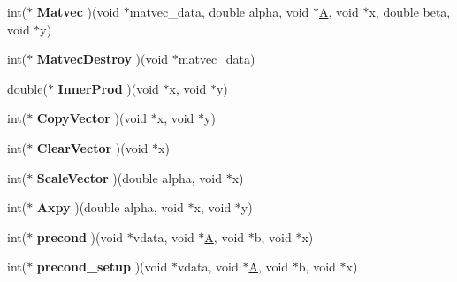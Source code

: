 \begin{DoxyCompactItemize}
\item 
\hypertarget{structhypre__PCGFunctions_aa9173923da123df082398997b230f3c7}{}int($\ast$ {\bfseries Matvec} )(void $\ast$matvec\+\_\+data, double alpha, void $\ast$\hyperlink{structA}{A}, void $\ast$x, double beta, void $\ast$y)\label{structhypre__PCGFunctions_aa9173923da123df082398997b230f3c7}

\item 
\hypertarget{structhypre__PCGFunctions_a9e36a23d7b5b2585d7f522c7b390a0f0}{}int($\ast$ {\bfseries Matvec\+Destroy} )(void $\ast$matvec\+\_\+data)\label{structhypre__PCGFunctions_a9e36a23d7b5b2585d7f522c7b390a0f0}

\item 
\hypertarget{structhypre__PCGFunctions_a4914af1fa866770c49017f5ccecdf1f8}{}double($\ast$ {\bfseries Inner\+Prod} )(void $\ast$x, void $\ast$y)\label{structhypre__PCGFunctions_a4914af1fa866770c49017f5ccecdf1f8}

\item 
\hypertarget{structhypre__PCGFunctions_a90e7623f3a4a15209a7930b9925a4034}{}int($\ast$ {\bfseries Copy\+Vector} )(void $\ast$x, void $\ast$y)\label{structhypre__PCGFunctions_a90e7623f3a4a15209a7930b9925a4034}

\item 
\hypertarget{structhypre__PCGFunctions_aa8df3a6f606ce4a77b43998569e2cfb9}{}int($\ast$ {\bfseries Clear\+Vector} )(void $\ast$x)\label{structhypre__PCGFunctions_aa8df3a6f606ce4a77b43998569e2cfb9}

\item 
\hypertarget{structhypre__PCGFunctions_a976647903fd8883f1cf774e716696a89}{}int($\ast$ {\bfseries Scale\+Vector} )(double alpha, void $\ast$x)\label{structhypre__PCGFunctions_a976647903fd8883f1cf774e716696a89}

\item 
\hypertarget{structhypre__PCGFunctions_a2f8556b8e22de50bd5678502b290b360}{}int($\ast$ {\bfseries Axpy} )(double alpha, void $\ast$x, void $\ast$y)\label{structhypre__PCGFunctions_a2f8556b8e22de50bd5678502b290b360}

\item 
\hypertarget{structhypre__PCGFunctions_a71c318780338a5a90131b38998f1524d}{}int($\ast$ {\bfseries precond} )(void $\ast$vdata, void $\ast$\hyperlink{structA}{A}, void $\ast$b, void $\ast$x)\label{structhypre__PCGFunctions_a71c318780338a5a90131b38998f1524d}

\item 
\hypertarget{structhypre__PCGFunctions_ab46805ba7657a503c7e608b608f7f803}{}int($\ast$ {\bfseries precond\+\_\+setup} )(void $\ast$vdata, void $\ast$\hyperlink{structA}{A}, void $\ast$b, void $\ast$x)\label{structhypre__PCGFunctions_ab46805ba7657a503c7e608b608f7f803}

\end{DoxyCompactItemize}


